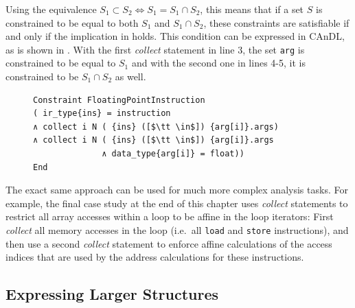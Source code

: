     Using the equivalence
    $S_1\subset S_2\iff S_1 = S_1\cap S_2$, this means that
    if a set $S$ is constrained to be equal to both $S_1$ and $S_1\cap S_2$,
    these constraints are satisfiable if and only if the implication in
     holds.
    This condition can be expressed in CAnDL, as is shown in
    .
    With the first {\it collect} statement in line 3, the set \texttt{arg} is
    constrained to be equal to $S_1$ and with the second one in lines 4-5, it
    is constrained to be $S_1\cap S_2$ as well.

\begin{figure}[H]
\begin{lstlisting}[language=CAnDL,label={fig:collectexample},caption=
   {{\it Collect} is used to restrict {\tt ins} to be calculated exclusively
    from floating point values.\leftskip=0pt\rightskip=0pt}]
Constraint FloatingPointInstruction
( ir_type{ins} = instruction
∧ collect i N ( {ins} ([$\tt \in$]) {arg[i]}.args)
∧ collect i N ( {ins} ([$\tt \in$]) {arg[i]}.args
              ∧ data_type{arg[i]} = float))
End
\end{lstlisting}
\end{figure}

    The exact same approach can be used for much more complex analysis tasks.
    For example, the final case study at the end of this chapter uses
    {\it collect} statements to restrict all array accesses within a
    loop to be affine in the loop iterators:
    First {\it collect} all memory accesses in the loop
    (i.e.\ all \texttt{load} and \texttt{store} instructions), and then use a
    second {\it collect} statement to enforce affine calculations of the access
    indices that are used by the address calculations for these instructions.

\subsection{Expressing Larger Structures}

